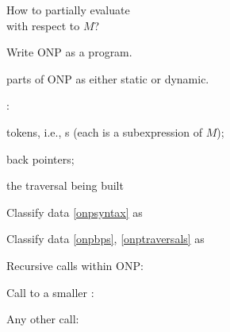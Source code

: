 \documentclass[12pt,fleqn,landscape]{article}
\begin{document}

\begin{slide}{How to partially evaluate \\ with respect to $M$?}


\be

\item Write ONP as a program. \vair

\item {}  parts of ONP   as either static or dynamic.

: 
\be
\item\label{onpsyntax} tokens, i.e., {\lexp}s \hfill (each is a subexpression of $M$);
\item\label{onpbps} back pointers;
\item\label{onptraversals} the traversal being built
\ee
\vair

\item Classify data \ref{onpsyntax} as   \hfill {}
\vair

\item Classify data \ref{onpbps},  \ref{onptraversals} as 
\vair

\item Recursive calls within ONP:
\bi
\item Call to a smaller \lexp:  \hfill {} 

\item Any other call:  \hfill  {} 
\ei

\ee


\end{slide}




\end{document}
